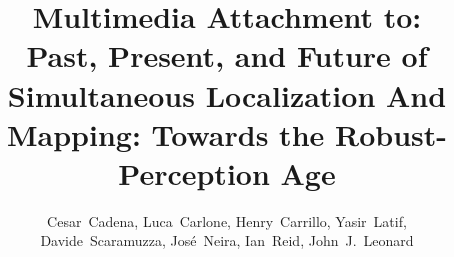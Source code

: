 \documentclass[10pt,final,journal,letterpaper,twoside,onecolumn]{IEEEtran}
\begin{document}
\title{Multimedia Attachment to: \\Past, Present, and Future of Simultaneous Localization And Mapping: Towards the Robust-Perception Age}
\author{
Cesar~Cadena, Luca~Carlone, Henry~Carrillo, Yasir~Latif, \\ Davide~Scaramuzza, Jos\'e~Neira, Ian~Reid, John~J.~Leonard
}
%
\maketitle
%

\clearpage


\footnotesize{

}
\end{document}
